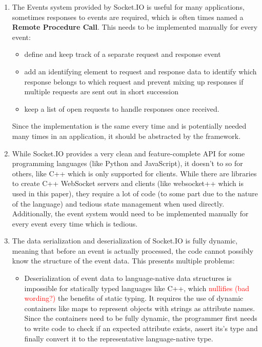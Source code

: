 \documentclass[conference]{IEEEtran}
\begin{document}
\begin{enumerate}
    \item The Events system provided by Socket.IO is useful for many applications, sometimes responses to events are required, which is often times named a \textbf{Remote Procedure Call}. This needs to be implemented manually for every event:
    \begin{itemize}
        \item define and keep track of a separate request and response event
        \item add an identifying element to request and response data to identify which response belongs to which request and prevent mixing up responses if multiple requests are sent out in short succession
        \item keep a list of open requests to handle responses once received.
    \end{itemize}
    Since the implementation is the same every time and is potentially needed many times in an application, it should be abstracted by the framework.
    \item While Socket.IO provides a very clean and feature-complete API for some programming languages (like Python and JavaScript), it doesn't to so for others, like C++ which is only supported for clients. While there are libraries to create C++ WebSocket servers and clients (like websocket++ which is used in this paper), they require a lot of code (to some part due to the nature of the language) and tedious state management when used directly. Additionally, the event system would need to be implemented manually for every event every time which is tedious. \cite{b4}
    \item The data serialization and deserialization of Socket.IO is fully dynamic, meaning that before an event is actually processed, the code cannot possibly know the structure of the event data. This presents multiple problems:
    \begin{itemize}
        \item Deserialization of event data to language-native data structures is impossible for statically typed languages like C++, which \textcolor{red}{nullifies (bad wording?)} the benefits of static typing. It requires the use of dynamic containers like maps to represent objects with strings as attribute names. Since the containers need to be fully dynamic, the programmer first needs to write code to check if an expected attribute exists, assert its's type and finally convert it to the representative language-native type.

\end{itemize}
\end{enumerate}
\end{document}
